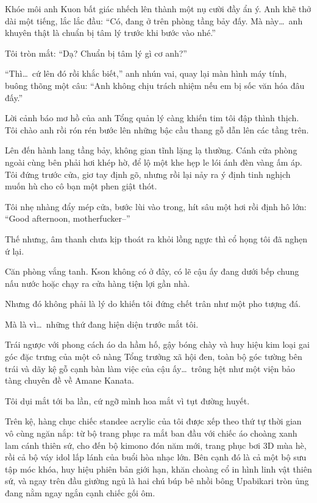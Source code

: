 \documentclass[../main.tex]{subfiles}
\begin{document}
Khóe môi anh Kuon bất giác nhếch lên thành một nụ cười đầy ẩn ý. Anh khẽ thở dài một tiếng, lắc lắc đầu: ``Có, đang ở trên phòng tầng bảy đấy. Mà này\dots\ anh khuyên thật là chuẩn bị tâm lý trước khi bước vào nhé.''

Tôi tròn mắt: ``Dạ? Chuẩn bị tâm lý gì cơ anh?''

``Thì\dots\ cứ lên đó rồi khắc biết,'' anh nhún vai, quay lại màn hình máy tính, buông thõng một câu: ``Anh không chịu trách nhiệm nếu em bị sốc văn hóa đâu đấy.''

Lời cảnh báo mơ hồ của anh Tổng quản lý càng khiến tim tôi đập thình thịch. Tôi chào anh rồi rón rén bước lên những bậc cầu thang gỗ dẫn lên các tầng trên.

Lên đến hành lang tầng bảy, không gian tĩnh lặng lạ thường. Cánh cửa phòng ngoài cùng bên phải hơi khép hờ, để lộ một khe hẹp le lói ánh đèn vàng ấm áp. Tôi đứng trước cửa, giơ tay định gõ, nhưng rồi lại nảy ra ý định tinh nghịch muốn hù cho cô bạn một phen giật thót.

Tôi nhẹ nhàng đẩy mép cửa, bước lùi vào trong, hít sâu một hơi rồi định hô lớn: ``Good afternoon, motherfucker--''

Thế nhưng, âm thanh chưa kịp thoát ra khỏi lồng ngực thì cổ họng tôi đã nghẹn ứ lại.

Căn phòng vắng tanh. Kson không có ở đây, có lẽ cậu ấy đang dưới bếp chung nấu nước hoặc chạy ra cửa hàng tiện lợi gần nhà.

Nhưng đó không phải là lý do khiến tôi đứng chết trân như một pho tượng đá.

Mà là vì\dots\ những thứ đang hiện diện trước mắt tôi.

Trái ngược với phong cách áo da hầm hố, gậy bóng chày và huy hiệu kim loại gai góc đặc trưng của một cô nàng Tổng trưởng xã hội đen, toàn bộ góc tường bên trái và dãy kệ gỗ cạnh bàn làm việc của cậu ấy\dots\ trông hệt như một viện bảo tàng chuyên đề về Amane Kanata.

Tôi dụi mắt tới ba lần, cứ ngỡ mình hoa mắt vì tụt đường huyết.

Trên kệ, hàng chục chiếc standee acrylic của tôi được xếp theo thứ tự thời gian vô cùng ngăn nắp: từ bộ trang phục ra mắt ban đầu với chiếc áo choàng xanh lam cánh thiên sứ, cho đến bộ kimono đón năm mới, trang phục bơi 3D mùa hè, rồi cả bộ váy idol lấp lánh của buổi hòa nhạc lớn. Bên cạnh đó là cả một bộ sưu tập móc khóa, huy hiệu phiên bản giới hạn, khăn choàng cổ in hình linh vật thiên sứ, và ngay trên đầu giường ngủ là hai chú búp bê nhồi bông Upabikari tròn ủng đang nằm ngay ngắn cạnh chiếc gối ôm.
\end{document}
